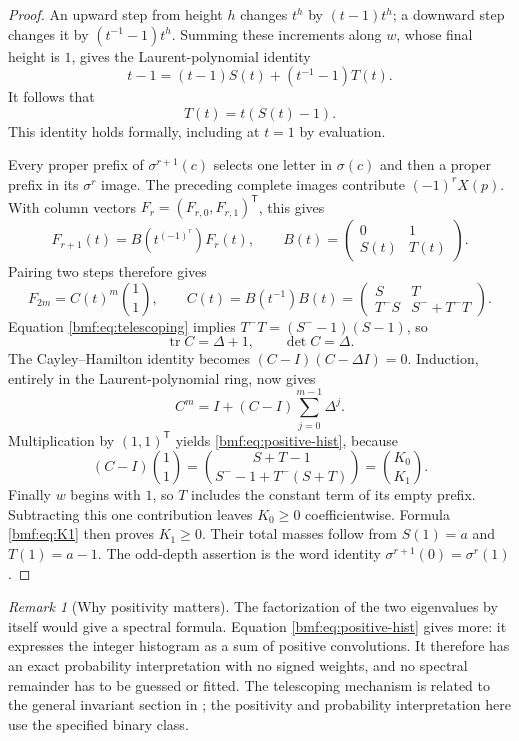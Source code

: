 \documentclass[11pt]{article}
\numberwithin{equation}{section}
\theoremstyle{definition}
\theoremstyle{remark}
\newtheorem{remark}[theorem]{Remark}
\begin{document}
\begin{proof}
An upward step from height $h$ changes $t^h$ by
$(t-1)t^h$; a downward step changes it by
$(t^{-1}-1)t^h$. Summing these increments along $w$, whose final
height is $1$, gives the Laurent-polynomial identity
\[
 t-1=(t-1)S(t)+(t^{-1}-1)T(t).
\]
It follows that
\begin{equation}\label{bmf:eq:telescoping}
 T(t)=t(S(t)-1).
\end{equation}
This identity holds formally, including at $t=1$ by evaluation.

Every proper prefix of $\sigma^{r+1}(c)$ selects one letter in
$\sigma(c)$ and then a proper prefix in its $\sigma^r$ image.
The preceding complete images contribute
$(-1)^r X(p)$. With column vectors
$F_r=(F_{r,0},F_{r,1})^{\mathsf T}$, this gives
\begin{equation}\label{bmf:eq:one-step}
 F_{r+1}(t)=B(t^{(-1)^r})F_r(t),
 \qquad
 B(t)=\begin{pmatrix}0&1\\S(t)&T(t)\end{pmatrix}.
\end{equation}
Pairing two steps therefore gives
\begin{equation}\label{bmf:eq:paired}
 F_{2m}=C(t)^m\binom11,\qquad
 C(t)=B(t^{-1})B(t)
 =\begin{pmatrix}S&T\\T^-S&S^-+T^-T\end{pmatrix}.
\end{equation}
Equation \eqref{bmf:eq:telescoping} implies
$T^-T=(S^--1)(S-1)$, so
\[
 \operatorname{tr}C=\Delta+1,\qquad \det C=\Delta.
\]
The Cayley--Hamilton identity becomes
$(C-I)(C-\Delta I)=0$. Induction, entirely in the Laurent-polynomial
ring, now gives
\[
 C^m=I+(C-I)\sum_{j=0}^{m-1}\Delta^j.
\]
Multiplication by $(1,1)^{\mathsf T}$ yields
\eqref{bmf:eq:positive-hist}, because
\[
 (C-I)\binom11
 =\binom{S+T-1}{S^--1+T^-(S+T)}
 =\binom{K_0}{K_1}.
\]
Finally $w$ begins with $1$, so $T$ includes the constant term
of its empty prefix. Subtracting this one contribution leaves
$K_0\geq0$ coefficientwise. Formula \eqref{bmf:eq:K1} then proves
$K_1\geq0$. Their total masses follow from $S(1)=a$ and $T(1)=a-1$.
The odd-depth assertion is the word identity
$\sigma^{r+1}(0)=\sigma^r(1)$.
\end{proof}

\begin{remark}[Why positivity matters]
The factorization of the two eigenvalues by itself would give a
spectral formula. Equation \eqref{bmf:eq:positive-hist} gives more:
it expresses the integer histogram as a sum of positive convolutions.
It therefore has an exact probability interpretation with no signed
weights, and no spectral remainder has to be guessed or fitted.
The telescoping mechanism is related to the general invariant section
in \cite[Proposition 3.1]{solomyak}; the positivity and probability
interpretation here use the specified binary class.
\end{remark}
\end{document}
